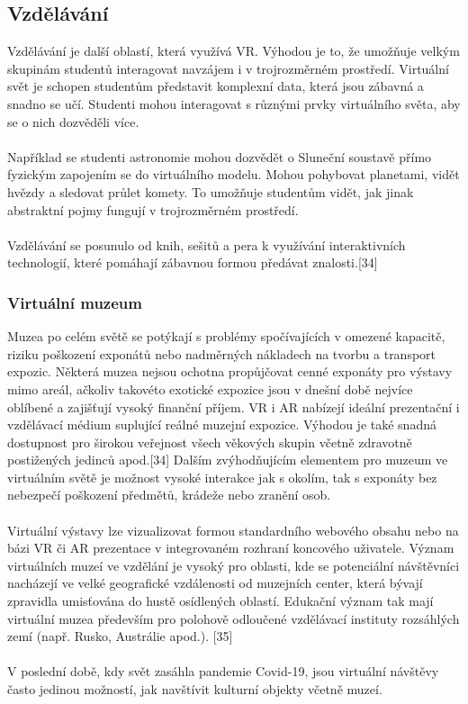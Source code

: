 \documentclass[a4paper, 12pt]{report}
\begin{document}
\subsection{Vzdělávání}
Vzdělávání je další oblastí, která využívá VR. Výhodou je to, že umožňuje velkým skupinám studentů interagovat navzájem i v trojrozměrném prostředí. Virtuální svět je schopen studentům představit komplexní data, která jsou zábavná a snadno se učí. Studenti mohou interagovat s různými prvky virtuálního světa, aby se o nich dozvěděli více.\\
\\
Například se studenti astronomie mohou dozvědět o Sluneční soustavě přímo fyzickým zapojením se do virtuálního modelu. Mohou pohybovat planetami, vidět hvězdy a sledovat průlet komety. To umožňuje studentům vidět, jak jinak abstraktní pojmy fungují v trojrozměrném prostředí.\\
\\
Vzdělávání se posunulo od knih, sešitů a pera k využívání interaktivních technologií, které pomáhají zábavnou formou předávat znalosti.[34]

\subsubsection{Virtuální muzeum}
Muzea po celém světě se potýkají s problémy spočívajících v omezené kapacitě, riziku poškození exponátů nebo nadměrných nákladech na tvorbu a transport expozic. Některá muzea nejsou ochotna propůjčovat cenné exponáty pro výstavy mimo areál, ačkoliv takovéto exotické expozice jsou v dnešní době nejvíce oblíbené a zajišťují vysoký finanční příjem. VR i AR nabízejí ideální prezentační i vzdělávací médium suplující reálné muzejní expozice. Výhodou je také snadná dostupnost pro širokou veřejnost všech věkových skupin včetně zdravotně postižených jedinců apod.[34] Dalším zvýhodňujícím elementem pro muzeum ve virtuálním světě je možnost vysoké interakce jak s okolím, tak s exponáty bez nebezpečí poškození předmětů, krádeže nebo zranění osob.\\
\\
Virtuální výstavy lze vizualizovat formou standardního webového obsahu nebo na bázi VR či AR prezentace v integrovaném rozhraní koncového uživatele. Význam virtuálních muzeí ve vzdělání je vysoký pro oblasti, kde se potenciální návštěvníci nacházejí ve velké geografické vzdálenosti od muzejních center, která bývají zpravidla umisťována do hustě osídlených oblastí. Edukační význam tak mají virtuální muzea především pro polohově odloučené vzdělávací instituty rozsáhlých zemí (např. Rusko, Austrálie apod.). [35]\\
\\
V poslední době, kdy svět zasáhla pandemie Covid-19, jsou virtuální návštěvy často jedinou možností, jak navštívit kulturní objekty včetně muzeí.
\end{document}
